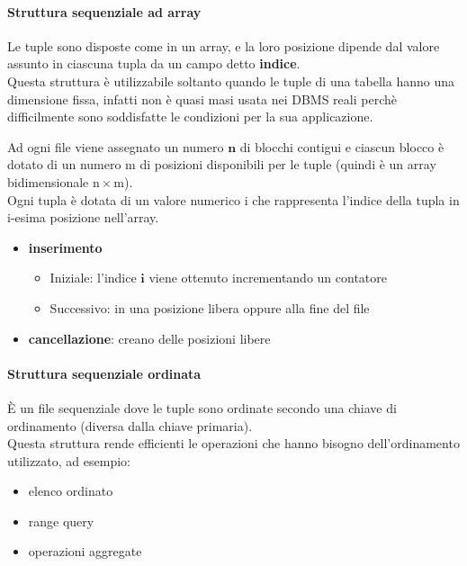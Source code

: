 \paragraph{Struttura sequenziale ad array}
Le tuple sono disposte come in un array, e la loro posizione dipende dal valore assunto in ciascuna tupla da un campo detto \textbf{indice}.\\[0.2ex]
Questa struttura è utilizzabile soltanto quando le tuple di una tabella
hanno una dimensione fissa, infatti non è quasi masi usata nei DBMS reali perchè difficilmente sono soddisfatte le condizioni per la sua applicazione.

Ad ogni file viene assegnato un numero $\boldsymbol{n}$ di blocchi contigui e ciascun blocco è dotato di un numero m di posizioni disponibili per le tuple (quindi è un array bidimensionale $\mathrm{n \times m}$).\\[0.2ex]
Ogni tupla è dotata di un valore numerico i che rappresenta l'indice della tupla in i-esima posizione nell'array.

\begin{itemize}[label=$\Rightarrow$, itemsep=\smallskipamount]
  \item \textbf{inserimento}
  \begin{itemize}[itemsep=\smallskipamount]
    \item Iniziale: l’indice $\boldsymbol{i}$ viene ottenuto incrementando un contatore
    \item Successivo: in una posizione libera oppure alla fine del file
  \end{itemize}
  \item \textbf{cancellazione}: creano delle posizioni libere
\end{itemize}

\paragraph{Struttura sequenziale ordinata}
È un file sequenziale dove le tuple sono ordinate secondo una chiave di ordinamento (diversa dalla chiave primaria).\\[0.2ex]
Questa struttura rende efficienti le operazioni che hanno bisogno
dell'ordinamento utilizzato, ad esempio:
\begin{itemize}[label=$\circ$, itemsep=\smallskipamount]
  \item elenco ordinato
  \item range query
  \item operazioni aggregate
\end{itemize}

